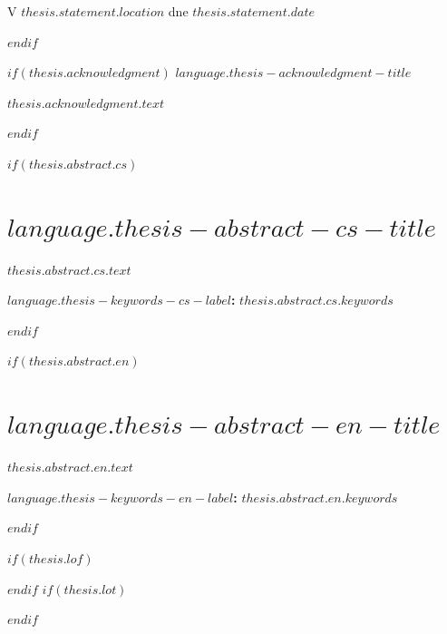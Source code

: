 \vspace{2em}

\noindent V $thesis.statement.location$ dne $thesis.statement.date$

\vspace{2.5cm}

\noindent\makebox[15em]{\dotfill}

\clearpage
$endif$

$if(thesis.acknowledgment)$
\thispagestyle{empty}
\vspace*{\fill}
{\Large\bfseries $language.thesis-acknowledgment-title$}

\vspace{\chapterafterskip}

$thesis.acknowledgment.text$

\clearpage
$endif$

$if(thesis.abstract.cs)$
\thispagestyle{empty}
\chapter*{$language.thesis-abstract-cs-title$}


$thesis.abstract.cs.text$

\bigskip

\noindent\textbf{$language.thesis-keywords-cs-label$:} $thesis.abstract.cs.keywords$

\clearpage
$endif$

$if(thesis.abstract.en)$
\thispagestyle{empty}
\chapter*{$language.thesis-abstract-en-title$}


$thesis.abstract.en.text$

\bigskip

\noindent\textbf{$language.thesis-keywords-en-label$:} $thesis.abstract.en.keywords$

\clearpage
$endif$

\renewcommand{\contentsname}{$language.thesis-toc-title$}
\renewcommand{\listfigurename}{$language.thesis-lof-title$}
\renewcommand{\listtablename}{$language.thesis-lot-title$}
\setcounter{tocdepth}{$if(toc-depth)$$toc-depth$$else$3$endif$}
{\singlespacing
\tableofcontents
$if(thesis.lof)$\listoffigures$endif$
$if(thesis.lot)$\listoftables$endif$
}

